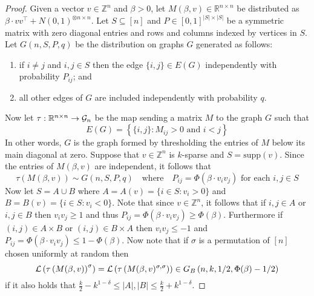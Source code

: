 \begin{proof}
Given a vector $v \in \mathbb{Z}^n$ and $\beta > 0$, let $M(\beta, v) \in \mathbb{R}^{n \times n}$ be distributed as $\beta \cdot vv^\top + N(0, 1)^{\otimes n \times n}$. Let $S \subseteq [n]$ and $P \in [0, 1]^{|S| \times |S|}$ be a symmetric matrix with zero diagonal entries and rows and columns indexed by vertices in $S$. Let $G\left(n, S, P, q\right)$ be the distribution on graphs $G$ generated as follows:
\begin{enumerate}
\item if $i \neq j$ and $i, j \in S$ then the edge $\{i, j\} \in E(G)$ independently with probability $P_{ij}$; and
\item all other edges of $G$ are included independently with probability $q$.
\end{enumerate}
Now let $\tau : \mathbb{R}^{n \times n} \to \mathcal{G}_n$ be the map sending a matrix $M$ to the graph $G$ such that
$$E(G) = \left\{ \{i, j \} : M_{ij} > 0 \text{ and } i < j \right\}$$
In other words, $G$ is the graph formed by thresholding the entries of $M$ below its main diagonal at zero. Suppose that $v \in \mathbb{Z}^n$ is $k$-sparse and $S = \text{supp}(v)$. Since the entries of $M(\beta, v)$ are independent, it follows that
$$\tau\left(M(\beta, v)\right) \sim G(n, S, P, q) \quad \text{where} \quad P_{ij} = \Phi\left( \beta \cdot v_i v_j \right) \text{ for each } i, j \in S$$
Now let $S = A \cup B$ where $A = A(v) = \{ i \in S : v_i > 0 \}$ and $B = B(v) = \{ i \in S : v_i < 0 \}$. Note that since $v \in \mathbb{Z}^n$, it follows that if $i, j \in A$ or $i, j \in B$ then $v_i v_j \ge 1$ and thus $P_{ij} = \Phi\left( \beta \cdot v_i v_j \right) \ge \Phi(\beta)$. Furthermore if $(i, j) \in A \times B$ or $(i, j) \in B \times A$ then $v_i v_j \le - 1$ and $P_{ij} = \Phi\left( \beta \cdot v_i v_j \right) \le 1 - \Phi(\beta)$. Now note that if $\sigma$ is a permutation of $[n]$ chosen uniformly at random then
$$\mathcal{L}\left( \tau\left(M(\beta, v)\right)^{\sigma} \right) = \mathcal{L}\left( \tau\left(M(\beta, v)^{\sigma, \sigma}\right) \right) \in G_B\left(n, k, 1/2, \Phi(\beta) - 1/2 \right)$$
if it also holds that $\frac{k}{2} - k^{1 - \delta} \le |A|, |B| \le \frac{k}{2} + k^{1 - \delta}$.


\end{proof}
